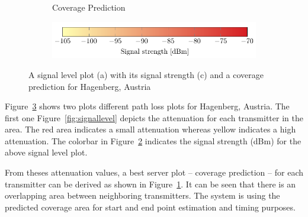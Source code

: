 \begin{figure}
\begin{subfigure}[b]{0.45\textwidth}
		\caption{Coverage Prediction}
		\label{fig:coveragepred}
	\end{subfigure}
\begin{subfigure}[b]{\textwidth}
		\includegraphics[width=\textwidth]{./images/signallevelbar}
		\caption{}
		\label{fig:signallevelbar}
	\end{subfigure}



	\caption{A signal level plot (a) with its signal strength (c) and a coverage prediction for Hagenberg, Austria }
	\label{fig:cellarea}
\end{figure}

Figure~\ref{fig:cellarea} shows two plots different path loss plots for Hagenberg, Austria. The first one Figure~\ref{fig:signallevel} depicts the attenuation for each transmitter in the area. The red area indicates a small attenuation whereas yellow indicates a high attenuation. The colorbar in Figure~\ref{fig:signallevelbar} indicates the signal strength (dBm) for the above signal level plot.

%
From theses attenuation values, a best server plot -- coverage prediction -- for each transmitter can be derived as shown in Figure~\ref{fig:coveragepred}. It can be seen that there is an overlapping area between neighboring transmitters. The system is using the predicted coverage area for start and end point estimation and timing purposes.



